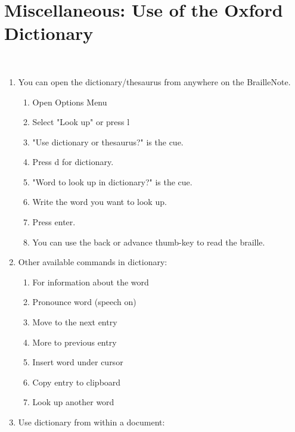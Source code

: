 \documentclass[10pt,letterpaper,twoside]{report}
\begin{document}
{{{\section{Miscellaneous: Use of the Oxford Dictionary}
\
\begin{enumerate}
	\item You can open the dictionary/thesaurus from anywhere on the BrailleNote.
	      \begin{enumerate}
		      \item Open Options Menu
		      \item Select "Look up" or press l
		      \item "Use dictionary or thesaurus?" is the cue.
		      \item Press d for dictionary.
		      \item "Word to look up in dictionary?" is the cue.
		      \item Write the word you want to look up.
		      \item Press enter.
		      \item You can use the back or advance thumb-key to read the braille.
	      \end{enumerate}
	\item Other available commands in dictionary:
	      \begin{enumerate}
		      \item For information about the word 
		      \item Pronounce word (speech on) 
		      \item Move to the next entry 
		      \item More to previous entry 
		      \item Insert word under cursor 
		      \item Copy entry to clipboard 
		      \item Look up another word \dotfill {\textcolor{accent}{\MakeUppercase{\textbf{ space + e }}}}
	      \end{enumerate}
	\item Use dictionary from within a document:
	      \begin{enumerate}

\end{enumerate}
\end{enumerate}}}}
\end{document}
